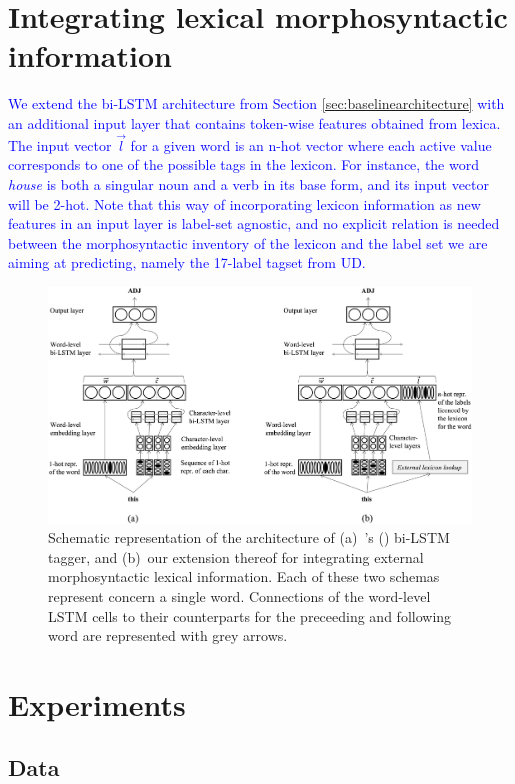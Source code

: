 \documentclass[11pt,letterpaper]{article}
\begin{document}
\section{Integrating lexical morphosyntactic information}

\textcolor{blue}{We extend the bi-LSTM architecture from Section \ref{sec:baselinearchitecture} with an additional input layer that contains token-wise features obtained from  lexica. The input vector $\vec{l}$ for a given word is an n-hot vector where each active value corresponds to one of the possible tags in the lexicon. For instance, the word \textit{house} is both a singular noun and a verb in its base form, and its input vector will be 2-hot.
Note that this way of incorporating lexicon information as new features in an input layer is label-set agnostic, and no explicit relation is needed between the morphosyntactic inventory of the lexicon and the label set we are aiming at predicting, namely the 17-label tagset from UD.}
\begin{figure}
\includegraphics[width=\linewidth]{emnlp17schema}
\caption{Schematic representation of the architecture of (a)~\citeauthor{plank16}'s (\citeyear{plank16}) bi-LSTM tagger,
and (b)~our extension thereof for integrating external morphosyntactic lexical information. Each of these two schemas
represent concern a single word. Connections of the word-level LSTM cells to their counterparts for the preceeding and
following word are represented with grey arrows.}\label{fig:schema}
\end{figure}

\section{Experiments}

\subsection{Data}
\end{document}
